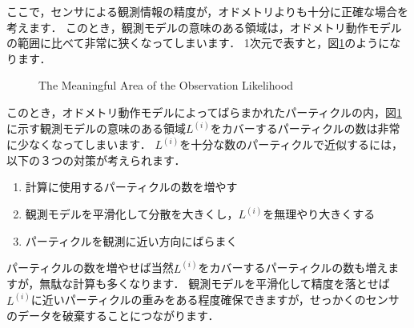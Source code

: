 \documentclass[{../../master}]{subfiles}
\begin{document}
ここで，センサによる観測情報の精度が，オドメトリよりも十分に正確な場合を考えます．
このとき，観測モデルの意味のある領域は，オドメトリ動作モデルの範囲に比べて非常に狭くなってしまいます．
1次元で表すと，図\ref{fig:meaningful_area_of_likelihood}のようになります．

\begin{figure}[ht]
  \centering
   \caption{The Meaningful Area of the Observation Likelihood}
   \label{fig:meaningful_area_of_likelihood}
\end{figure}

このとき，オドメトリ動作モデルによってばらまかれたパーティクルの内，図\ref{fig:meaningful_area_of_likelihood}に示す観測モデルの意味のある領域$L^{(i)}$をカバーするパーティクルの数は非常に少なくなってしまいます．
$L^{(i)}$を十分な数のパーティクルで近似するには，以下の３つの対策が考えられます．

\begin{enumerate}
  \item 計算に使用するパーティクルの数を増やす
  \item 観測モデルを平滑化して分散を大きくし，$L^{(i)}$を無理やり大きくする
  \item パーティクルを観測に近い方向にばらまく
\end{enumerate}

パーティクルの数を増やせば当然$L^{(i)}$をカバーするパーティクルの数も増えますが，無駄な計算も多くなります．
観測モデルを平滑化して精度を落とせば$L^{(i)}$に近いパーティクルの重みをある程度確保できますが，せっかくのセンサのデータを破棄することにつながります．
\end{document}
